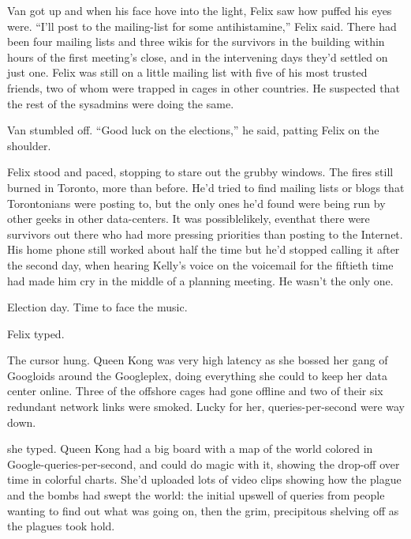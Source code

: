 Van got up and when his face hove into the light, Felix saw how
puffed his eyes were. “I’ll post to the mailing-list for some
antihistamine,” Felix said. There had been four mailing lists and
three wikis for the survivors in the building within hours of the
first meeting’s close, and in the intervening days they’d settled
on just one. Felix was still on a little mailing list with five of
his most trusted friends, two of whom were trapped in cages in
other countries. He suspected that the rest of the sysadmins were
doing the same.

Van stumbled off. “Good luck on the elections,” he said, patting
Felix on the shoulder.

Felix stood and paced, stopping to stare out the grubby windows.
The fires still burned in Toronto, more than before. He’d tried to
find mailing lists or blogs that Torontonians were posting to, but
the only ones he’d found were being run by other geeks in other
data-centers. It was possible\dash{}likely, even\dash{}that there were
survivors out there who had more pressing priorities than posting
to the Internet. His home phone still worked about half the time
but he’d stopped calling it after the second day, when hearing
Kelly’s voice on the voicemail for the fiftieth time had made him
cry in the middle of a planning meeting. He wasn’t the only one.

Election day. Time to face the music.

Felix typed.

The cursor hung. Queen Kong was very high latency as she bossed her
gang of Googloids around the Googleplex, doing everything she could
to keep her data center online. Three of the offshore cages had
gone offline and two of their six redundant network links were
smoked. Lucky for her, queries-per-second were way down.

she typed. Queen Kong had a big board with a map of the world
colored in Google-queries-per-second, and could do magic with it,
showing the drop-off over time in colorful charts. She’d uploaded
lots of video clips showing how the plague and the bombs had swept
the world: the initial upswell of queries from people wanting to
find out what was going on, then the grim, precipitous shelving off
as the plagues took hold.

